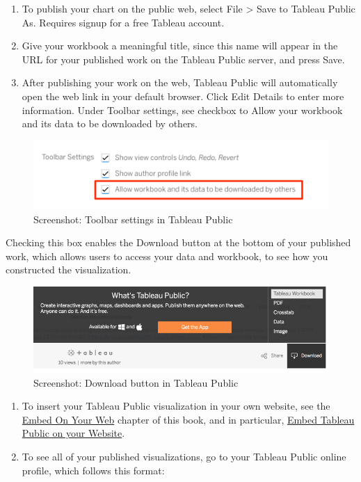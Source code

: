 \documentclass[
  english,
]{book}
\begin{document}
\begin{enumerate}
\def\labelenumi{\arabic{enumi})}
\setcounter{enumi}{13}
\item
  To publish your chart on the public web, select File \textgreater{} Save to Tableau Public As. Requires signup for a free Tableau account.
\item
  Give your workbook a meaningful title, since this name will appear in the URL for your published work on the Tableau Public server, and press Save.
\item
  After publishing your work on the web, Tableau Public will automatically open the web link in your default browser. Click Edit Details to enter more information. Under Toolbar settings, see checkbox to Allow your workbook and its data to be downloaded by others.
\end{enumerate}

\begin{figure}
\centering
\includegraphics{images/05-chart/tableau-toolbar-settings-allow.png}
\caption{Screenshot: Toolbar settings in Tableau Public}
\end{figure}

Checking this box enables the Download button at the bottom of your published work, which allows users to access your data and workbook, to see how you constructed the visualization.

\begin{figure}
\centering
\includegraphics{images/05-chart/tableau-download.png}
\caption{Screenshot: Download button in Tableau Public}
\end{figure}

\begin{enumerate}
\def\labelenumi{\arabic{enumi})}
\setcounter{enumi}{16}
\item
  To insert your Tableau Public visualization in your own website, see the \href{embed.html}{Embed On Your Web} chapter of this book, and in particular, \href{embed.html\#tableau}{Embed Tableau Public on your Website}.
\item
  To see all of your published visualizations, go to your Tableau Public online profile, which follows this format:
\end{enumerate}
\end{document}
